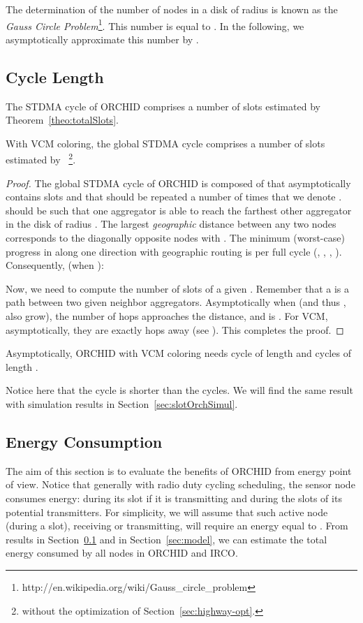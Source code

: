 The determination of the number of nodes in a disk of radius  is known as the \textit{Gauss Circle Problem}\footnote{http://en.wikipedia.org/wiki/Gauss\_circle\_problem}. This number is equal to . In the following, we asymptotically approximate this number by .
\subsection{Cycle Length}\label{sec:analysis}
The STDMA cycle of ORCHID comprises a number of slots estimated by Theorem~\ref{theo:totalSlots}. 
\begin{theorem}\label{theo:totalSlots}
With VCM coloring, the global STDMA cycle comprises a number of slots estimated by ~\footnote{without the optimization of Section~\ref{sec:highway-opt}.}.
\end{theorem}

\begin{proof}
The global STDMA cycle of ORCHID is composed of  that asymptotically contains  slots and  that should be repeated a number of times that we denote . 
 should be such that one aggregator is able to reach the farthest other aggregator in the disk of radius . The largest \emph{geographic} distance between any two nodes corresponds to the diagonally opposite nodes with . The minimum (worst-case) progress in along one direction with geographic routing is  per full  cycle
 (, , , ). Consequently, (when ):
 
Now, we need to compute the number of slots of a given . Remember that a  is a path between two given neighbor aggregators. 
Asymptotically when  (and thus ,  also 
grow), the number of hops approaches the distance, and is .
For VCM, asymptotically, they are exactly  hops away (see \cite{VCM}). 
This completes the proof.
\end{proof}

\begin{corollary}\label{coro:cycles}
Asymptotically, ORCHID with VCM coloring needs  cycle of length  and  cycles of length .
\end{corollary}

Notice here that the  cycle is shorter than the  cycles. We will find the same result with simulation results in Section~\ref{sec:slotOrchSimul}.

\subsection{Energy Consumption}\label{sec:energyCon}
The aim of this section is to evaluate the benefits of ORCHID from energy point of view. 
\newcommand{\cE}{\mathcal{E}}
Notice that generally with radio duty cycling scheduling, the sensor node consumes energy: during its slot if it is transmitting and during the slots of its potential transmitters. For simplicity, we will assume that such active node (during a slot), receiving or transmitting, will require an energy equal to .
From results in Section~\ref{sec:analysis} and in Section~\ref{sec:model}, we can estimate the total energy consumed by all nodes in ORCHID and IRCO. \\

